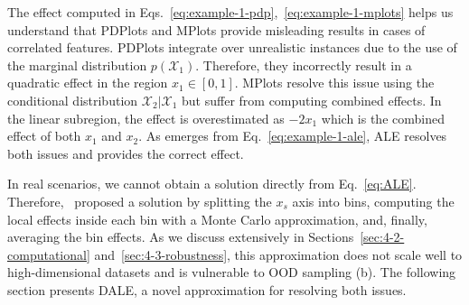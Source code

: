 The effect computed in Eqs.~\eqref{eq:example-1-pdp},~\eqref{eq:example-1-mplots} helps us understand that PDPlots and MPlots provide misleading results in cases of correlated features. PDPlots integrate over unrealistic instances due to the use of the marginal distribution \( p(\mathcal{X}_1) \). Therefore, they incorrectly result in a quadratic effect in the region \(x_1 \in [0, 1]\). MPlots resolve this issue using the conditional distribution \( \mathcal{X}_2|\mathcal{X}_1 \) but suffer from computing combined effects. In the linear subregion, the effect is overestimated as \( -2x_1 \) which is the combined effect of both \( x_1 \) and \( x_2 \). As emerges from Eq.~\eqref{eq:example-1-ale}, ALE resolves both issues and provides the correct effect.

In real scenarios, we cannot obtain a solution directly from Eq.~\eqref{eq:ALE}. Therefore,~\cite{Apley2020} proposed a solution by splitting the \(x_s\) axis into bins, computing the local effects inside each bin with a Monte Carlo approximation, and, finally, averaging the bin effects. As we discuss extensively in Sections~\ref{sec:4-2-computational} and~\ref{sec:4-3-robustness}, this approximation does not scale well to high-dimensional datasets and is vulnerable to OOD sampling (b). The following section presents DALE, a novel approximation for resolving both issues.
